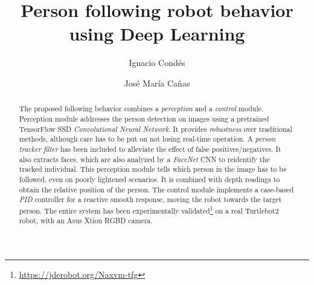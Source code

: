 \documentclass{svproc}
\begin{document}
\mainmatter              %
%
\title{Person following robot behavior using Deep Learning}
%
%
\author{Ignacio Condés \and José María Cañas}
%

%

\maketitle              %

\begin{abstract}
The proposed following behavior combines a \emph{perception} and a \emph{control} module. Perception module addresses the person detection on images using a pretrained TensorFlow SSD \emph{Convolutional Neural Network}. It provides \emph{robustness} over traditional methods, although care has to be put on not losing real-time operation. A \emph{person tracker filter} has been included to alleviate the effect of false positives/negatives. It also extracts faces, which are also analyzed by a \emph{FaceNet} CNN to reidentify the tracked individual. This perception module tells which person in the image has to be followed, even on poorly lightened scenarios. It is combined with depth readings to obtain the relative position of the person. The control module implements a case-based \emph{PID} controller for a reactive smooth response, moving the robot towards the target person. The entire system has been experimentally validated\footnote{\url{https://jderobot.org/Naxvm-tfg}} on a real Turtlebot2 robot, with an Asus Xtion RGBD camera.
\end{abstract}
%






\end{document}
